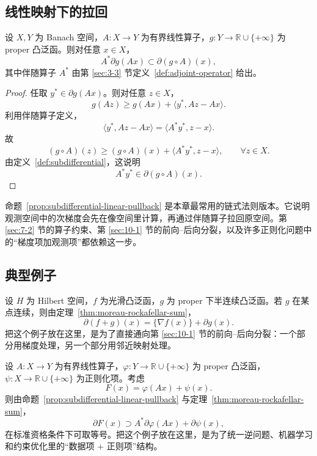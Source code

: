 \subsection{线性映射下的拉回}

\begin{proposition}[线性映射下的拉回与链式法则]\label{prop:subdifferential-linear-pullback}
设 $X,Y$ 为 Banach 空间，$A\colon X\to Y$ 为有界线性算子，$g\colon Y\to \mathbb R\cup\{+\infty\}$ 为 proper 凸泛函。则对任意 $x\in X$，
\[
A^\ast \partial g(Ax)\subset \partial (g\circ A)(x),
\]
其中伴随算子 $A^\ast$ 由第 \ref{sec:3-3} 节定义~\ref{def:adjoint-operator} 给出。
\end{proposition}

\begin{proof}
任取 $y^\ast\in \partial g(Ax)$。则对任意 $z\in X$，
\[
g(Az)\ge g(Ax)+\langle y^\ast,Az-Ax\rangle.
\]
利用伴随算子定义，
\[
\langle y^\ast,Az-Ax\rangle=\langle A^\ast y^\ast,z-x\rangle.
\]
故
\[
(g\circ A)(z)\ge (g\circ A)(x)+\langle A^\ast y^\ast,z-x\rangle,\qquad \forall z\in X.
\]
由定义~\ref{def:subdifferential}，这说明
\[
A^\ast y^\ast\in \partial(g\circ A)(x).
\]
\end{proof}

\begin{remark}
命题~\ref{prop:subdifferential-linear-pullback} 是本章最常用的链式法则版本。它说明观测空间中的次梯度会先在像空间里计算，再通过伴随算子拉回原空间。第 \ref{sec:7-2} 节的算子约束、第 \ref{sec:10-1} 节的前向--后向分裂，以及许多正则化问题中的“梯度项加观测项”都依赖这一步。
\end{remark}

\subsection{典型例子}

\begin{example}\label{ex:sum-rule-splitting}
设 $H$ 为 Hilbert 空间，$f$ 为光滑凸泛函，$g$ 为 proper 下半连续凸泛函。若 $g$ 在某点连续，则由定理~\ref{thm:moreau-rockafellar-sum}，
\[
\partial(f+g)(x)=\{\nabla f(x)\}+\partial g(x).
\]
把这个例子放在这里，是为了直接通向第 \ref{sec:10-1} 节的前向--后向分裂：一个部分用梯度处理，另一个部分用邻近映射处理。
\end{example}

\begin{example}[线性观测下的正则化]\label{ex:linear-observation-regularization}
设 $A\colon X\to Y$ 为有界线性算子，$\varphi\colon Y\to \mathbb R\cup\{+\infty\}$ 为 proper 凸泛函，$\psi\colon X\to \mathbb R\cup\{+\infty\}$ 为正则化项。考虑
\[
F(x)=\varphi(Ax)+\psi(x).
\]
则由命题~\ref{prop:subdifferential-linear-pullback} 与定理~\ref{thm:moreau-rockafellar-sum}，
\[
\partial F(x)\supset A^\ast \partial \varphi(Ax)+\partial \psi(x),
\]
在标准资格条件下可取等号。把这个例子放在这里，是为了统一逆问题、机器学习和约束优化里的“数据项 + 正则项”结构。
\end{example}

